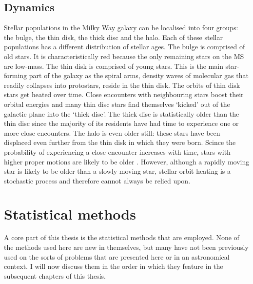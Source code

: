 \subsection{Dynamics}
Stellar populations in the Milky Way galaxy can be localised into four groups:
the bulge, the thin disk, the thick disc and the halo.
Each of these stellar populations has a different distribution of stellar
ages.
The bulge is comprised of old stars.
It is characteristically red because the only remaining stars on the MS are
low-mass.
The thin disk is comprised of young stars.
This is the main star-forming part of the galaxy as the spiral arms, density
waves of molecular gas that readily collapses into protostars, reside in the
thin disk.
The orbits of thin disk stars get heated over time.
Close encounters with neighbouring stars boost their orbital energies and many
thin disc stars find themselves `kicked' out of the galactic plane into the
`thick disc'.
The thick disc is statistically older than the thin disc since the majority of
its residents have had time to experience one or more close encounters.
The halo is even older still: these stars have been displaced even further
from the thin disk in which they were born.
Scince the probability of experiencing a close encounter increases with time,
stars with higher proper motions are likely to be older \citep[see,
\eg][]{Shevelev1989, Nissen1991}.
However, although a rapidly moving star is likely to be older than a slowly
moving star, stellar-orbit heating is a stochastic process and therefore
cannot always be relied upon.

\section{Statistical methods}

A core part of this thesis is the statistical methods that are employed.
None of the methods used here are new in themselves, but many have not been
previously used on the sorts of problems that are presented here or in an
astronomical context.
I will now discuss them in the order in which they feature in the subsequent
chapters of this thesis.

